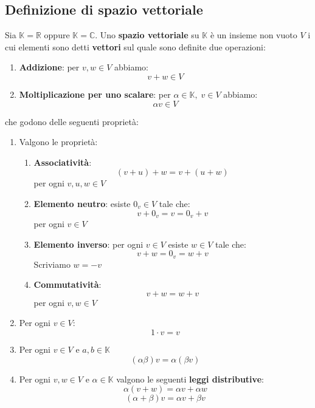 \documentclass[a4paper]{article}
\theoremstyle{break}
\theoremstyle{break}
\theoremstyle{break}
\theoremstyle{break}
\begin{document}
  \subsection{Definizione di spazio vettoriale}
  \begin{definition}
    Sia \( \mathbb{K} = \mathbb{R} \) oppure \( \mathbb{K} = \mathbb{C} \). Uno \textbf{
      spazio vettoriale} su \( \mathbb{K} \) è un insieme non vuoto \( V \) i cui
      elementi sono detti \textbf{vettori} sul quale sono definite due operazioni:
      \begin{enumerate}
        \item \textbf{Addizione}: per \( v,w \in V \) abbiamo:
          \[
          v+w \in V
          \] 
        \item \textbf{Moltiplicazione per uno scalare}:
          per \( \alpha \in \mathbb{K},\; v \in V \) abbiamo:
          \[
          \alpha v \in V
          \] 
      \end{enumerate}
      che godono delle seguenti proprietà:
      \begin{enumerate}
        \item Valgono le proprietà:
          \begin{enumerate}
            \item \textbf{Associatività}: \[ (v+u)+w = v+(u+w) \] per ogni \( v,u,w \in V \)
            \item \textbf{Elemento neutro}: esiste \( 0_v \in V \) tale che:
              \[
              v + 0_v = v = 0_v + v
              \] 
              per ogni \( v \in V \)
            \item \textbf{Elemento inverso}: per ogni \( v \in V \) esiste \( w \in V \) tale che:
              \[
              v + w = 0_v = w + v
              \] 
              Scriviamo \( w = -v \)
            \item \textbf{Commutatività}: \[ v+w = w+v \] per ogni \( v,w \in V \)

          \end{enumerate}
        \item Per ogni \( v \in V \):
          \[
          1 \cdot v = v
          \] 
        \item Per ogni \( v \in V \) e \( a,b \in \mathbb{K} \)   \[
        (\alpha \beta)v = \alpha(\beta v)
        \] 
        \item Per ogni \( v,w \in V \) e \( \alpha \in \mathbb{K} \) valgono le seguenti
          \textbf{leggi distributive}:
          \[
          \alpha(v+w) = \alpha v + \alpha w
          \] 
          \[
          (\alpha + \beta)v = \alpha v + \beta v
          \] 
      \end{enumerate}
  \end{definition}
\end{document}

